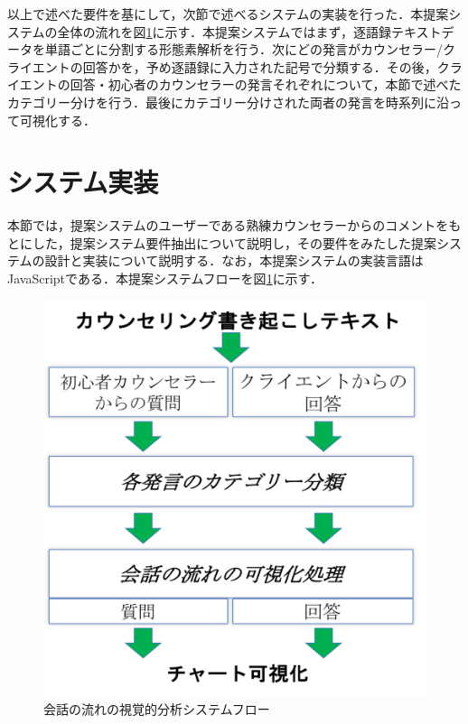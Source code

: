 \documentclass[shuuron]{kuee}
\begin{document}
以上で述べた要件を基にして，次節で述べるシステムの実装を行った．本提案システムの全体の流れを図\ref{fig:4_2}に示す．本提案システムではまず，逐語録テキストデータを単語ごとに分割する形態素解析を行う．次にどの発言がカウンセラー/クライエントの回答かを，予め逐語録に入力された記号で分類する．その後，クライエントの回答・初心者のカウンセラーの発言それぞれについて，本節で述べたカテゴリー分けを行う．最後にカテゴリー分けされた両者の発言を時系列に沿って可視化する．

\section{システム実装}

本節では，提案システムのユーザーである熟練カウンセラーからのコメントをもとにした，提案システム要件抽出について説明し，その要件をみたした提案システムの設計と実装について説明する．なお，本提案システムの実装言語はJavaScriptである．本提案システムフローを図\ref{fig:4_2}に示す．

\begin{figure}
  \begin{center}
    \includegraphics[width=\linewidth]{4_2.png}
  \end{center}
  \caption{会話の流れの視覚的分析システムフロー}
  \label{fig:4_2}
\end{figure}
\end{document}
